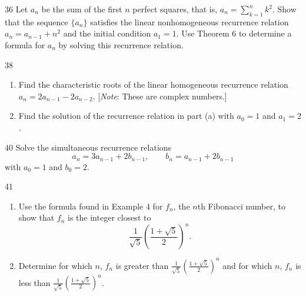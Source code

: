 \documentclass[11pt]{article}
\begin{document}
\begin{exercise}{36}
    Let $a_n$ be the sum of the first $n$ perfect squares, that is,
    $a_n = \sum_{k=1}^{n} k^2$. Show that the sequence $\{a_n\}$
    satisfies the linear nonhomogeneous recurrence relation
    $a_n = a_{n-1} + n^2$ and the initial condition $a_1 = 1$. Use
    Theorem 6 to determine a formula for $a_n$ by solving this
    recurrence relation.
\end{exercise}

\begin{exercise}{38}
    \begin{enumerate}[label=(\alph*)]
        \item Find the characteristic roots of the linear homogeneous
        recurrence relation $a_n = 2a_{n-1} - 2a_{n-2}$. [\emph{Note}:
        These are complex numbers.]
        \item Find the solution of the recurrence relation in part
        (a) with $a_0 = 1$ and $a_1 = 2$.
    \end{enumerate}
\end{exercise}

\begin{exercise}{40}
    Solve the simultaneous recurrence relations
    \[
    a_n = 3a_{n-1} + 2b_{n-1}, \qquad b_n = a_{n-1} + 2b_{n-1}
    \]
    with $a_0 = 1$ and $b_0 = 2$.
\end{exercise}

\begin{exercise}{41}
    \begin{enumerate}[label=(\alph*)]
        \item Use the formula found in Example 4 for $f_n$, the $n$th
        Fibonacci number, to show that $f_n$ is the integer closest
        to
        \[
        \frac{1}{\sqrt{5}} \left( \frac{1+\sqrt{5}}{2} \right)^n.
        \]
        \item Determine for which $n$, $f_n$ is greater than
        $\frac{1}{\sqrt{5}} \left( \frac{1+\sqrt{5}}{2} \right)^n$
        and for which $n$, $f_n$ is less than
        $\frac{1}{\sqrt{5}} \left( \frac{1+\sqrt{5}}{2} \right)^n$.
    \end{enumerate}
\end{exercise}
\end{document}
